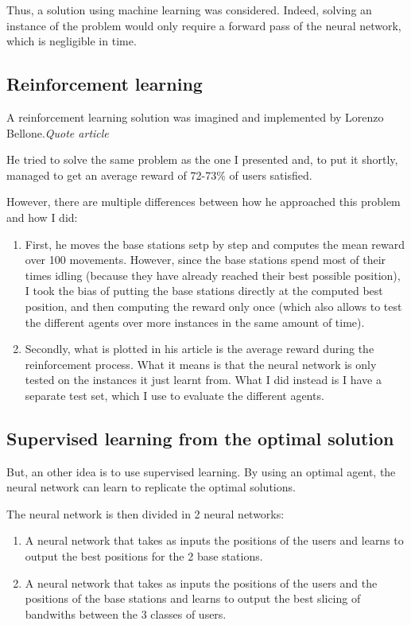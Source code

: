 \documentclass[letterpaper]{article}
\begin{document}
Thus, a solution using machine learning was considered.
Indeed, solving an instance of the problem would only require a forward pass of the neural network, which is negligible in time.

\subsection{Reinforcement learning}

A reinforcement learning solution was imagined and implemented by Lorenzo Bellone.\textit{Quote article}

He tried to solve the same problem as the one I presented and, to put it shortly, managed to get an average reward of 72-73\% of users satisfied.

However, there are multiple differences between how he approached this problem and how I did:

\begin{enumerate}
    \item First, he moves the base stations setp by step and computes the mean reward over 100 movements.
          However, since the base stations spend most of their times idling (because they have already reached their best possible position),
          I took the bias of putting the base stations directly at the computed best position, and then computing the reward only once (which also allows to test the different agents over more instances in the same amount of time).
    \item Secondly, what is plotted in his article is the average reward during the reinforcement process.
          What it means is that the neural network is only tested on the instances it just learnt from.
          What I did instead is I have a separate test set, which I use to evaluate the different agents.
\end{enumerate}

\subsection{Supervised learning from the optimal solution}

But, an other idea is to use supervised learning.
By using an optimal agent, the neural network can learn to replicate the optimal solutions.

The neural network is then divided in 2 neural networks:

\begin{enumerate}
    \item A neural network that takes as inputs the positions of the users and learns to output the best positions for the 2 base stations.
    \item A neural network that takes as inputs the positions of the users and the positions of the base stations and learns to output the best slicing of bandwiths between the 3 classes of users.
\end{enumerate}
\end{document}
